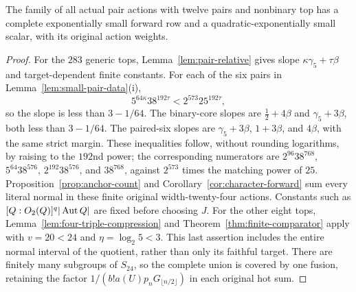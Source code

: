 \begin{theorem}\label{thm:twelve-pairs}
The family of all actual pair actions with twelve pairs and nonbinary
top has a complete exponentially small forward row and a
quadratic-exponentially small scalar, with its original action weights.
\end{theorem}
\begin{proof}
For the $283$ generic tops, Lemma~\ref{lem:pair-relative} gives slope
$\kappa\gamma_5+\tau\beta$ and target-dependent finite constants.
For each of the six pairs in Lemma~\ref{lem:small-pair-data}(i),
\[
 5^{64\kappa}38^{192\tau}<2^{573}25^{192\tau},
\]
so the slope is less than $3-1/64$. The binary-core slopes are
$\frac12+4\beta$ and $\gamma_5+3\beta$, both less than $3-1/64$.
The paired-six slopes
are $\gamma_5+3\beta$, $1+3\beta$, and $4\beta$, with the same
strict margin. These inequalities follow, without rounding logarithms,
by raising to the $192$nd power; the corresponding numerators are
$2^{96}38^{768}$, $5^{64}38^{576}$,
$2^{192}38^{576}$, and $38^{768}$, against $2^{573}$ times the
matching power of $25$. Proposition~\ref{prop:anchor-count} and
Corollary~\ref{cor:character-forward} sum every literal normal in these
finite original width-twenty-four actions. Constants such as
$[Q:O_2(Q)]^q|\operatorname{Aut} Q|$ are fixed before choosing $J$.
For the other eight tops, Lemma~\ref{lem:four-triple-compression}
and Theorem~\ref{thm:finite-comparator} apply with $v=20<24$ and
$\eta=\log_2 5<3$. This last assertion includes the entire normal
interval of the quotient, rather than only its faithful target.
There are finitely many subgroups of $S_{24}$, so the complete union
is covered by one fusion, retaining the factor
$1/(b!a(U)p_nG_{\lfloor n/2\rfloor})$ in each original hot sum.
\end{proof}
